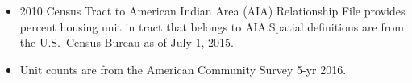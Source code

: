 \begin{itemize}
\item 2010 Census Tract to American Indian Area (AIA) Relationship File provides percent housing unit in tract that belongs to AIA.Spatial definitions are from the U.S.~Census Bureau as of July 1, 2015.
\item Unit counts are from the American Community Survey 5-yr 2016.
\end{itemize}
